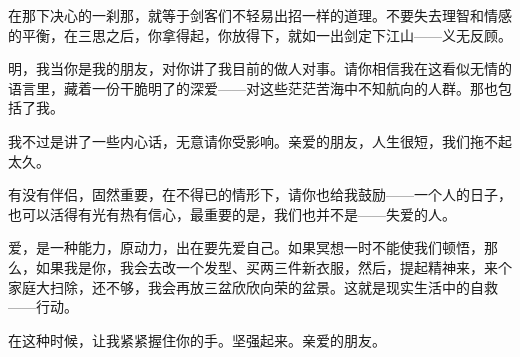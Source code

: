 \par 在那下决心的一刹那，就等于剑客们不轻易出招一样的道理。不要失去理智和情感的平衡，在三思之后，你拿得起，你放得下，就如一出剑定下江山——义无反顾。
\par 明，我当你是我的朋友，对你讲了我目前的做人对事。请你相信我在这看似无情的语言里，藏着一份干脆明了的深爱——对这些茫茫苦海中不知航向的人群。那也包括了我。
\par 我不过是讲了一些内心话，无意请你受影响。亲爱的朋友，人生很短，我们拖不起太久。
\par 有没有伴侣，固然重要，在不得已的情形下，请你也给我鼓励——一个人的日子，也可以活得有光有热有信心，最重要的是，我们也并不是——失爱的人。
\par 爱，是一种能力，原动力，出在要先爱自己。如果冥想一时不能使我们顿悟，那么，如果我是你，我会去改一个发型、买两三件新衣服，然后，提起精神来，来个家庭大扫除，还不够，我会再放三盆欣欣向荣的盆景。这就是现实生活中的自救——行动。
\par 在这种时候，让我紧紧握住你的手。坚强起来。亲爱的朋友。
\par {}

